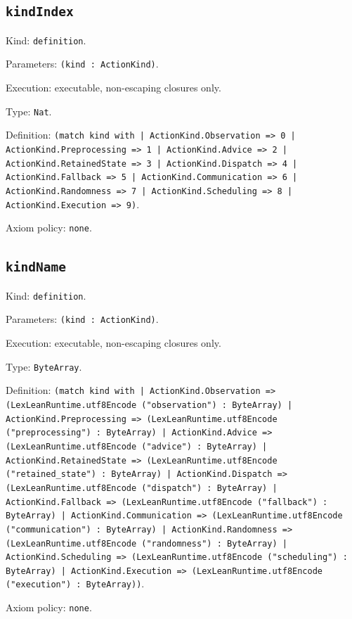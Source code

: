 \documentclass[11pt]{article}
\begin{document}
\subsection*{\texttt{kindIndex}}
\noindent Kind: \texttt{definition}.\par
\noindent Parameters: \texttt{(kind : ActionKind)}.\par
\noindent Execution: executable, non-escaping closures only.\par
\noindent Type: \texttt{Nat}.\par
\noindent Definition: \texttt{(match kind with | ActionKind.Observation => 0 | ActionKind.Preprocessing => 1 | ActionKind.Advice => 2 | ActionKind.RetainedState => 3 | ActionKind.Dispatch => 4 | ActionKind.Fallback => 5 | ActionKind.Communication => 6 | ActionKind.Randomness => 7 | ActionKind.Scheduling => 8 | ActionKind.Execution => 9)}.\par
\noindent Axiom policy: \texttt{none}.\par
\subsection*{\texttt{kindName}}
\noindent Kind: \texttt{definition}.\par
\noindent Parameters: \texttt{(kind : ActionKind)}.\par
\noindent Execution: executable, non-escaping closures only.\par
\noindent Type: \texttt{ByteArray}.\par
\noindent Definition: \texttt{(match kind with | ActionKind.Observation => (LexLeanRuntime.utf8Encode ("observation") : ByteArray) | ActionKind.Preprocessing => (LexLeanRuntime.utf8Encode ("preprocessing") : ByteArray) | ActionKind.Advice => (LexLeanRuntime.utf8Encode ("advice") : ByteArray) | ActionKind.RetainedState => (LexLeanRuntime.utf8Encode ("retained\_state") : ByteArray) | ActionKind.Dispatch => (LexLeanRuntime.utf8Encode ("dispatch") : ByteArray) | ActionKind.Fallback => (LexLeanRuntime.utf8Encode ("fallback") : ByteArray) | ActionKind.Communication => (LexLeanRuntime.utf8Encode ("communication") : ByteArray) | ActionKind.Randomness => (LexLeanRuntime.utf8Encode ("randomness") : ByteArray) | ActionKind.Scheduling => (LexLeanRuntime.utf8Encode ("scheduling") : ByteArray) | ActionKind.Execution => (LexLeanRuntime.utf8Encode ("execution") : ByteArray))}.\par
\noindent Axiom policy: \texttt{none}.\par
\end{document}
